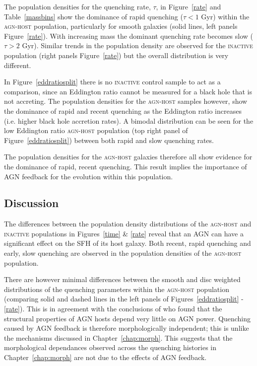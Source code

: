 The population densities for the quenching rate, $\tau$, in Figure~\ref{rate} and Table~\ref{massbins} show the dominance of rapid quenching ($\tau < 1$ Gyr) within the \textsc{agn-host} population, particularly for smooth galaxies (solid lines, left panels Figure~\ref{rate}). With increasing mass the dominant quenching rate becomes slow ($\tau > 2$ Gyr). Similar trends in the population density are observed for the \textsc{inactive} population (right panels Figure~\ref{rate}) but the overall distribution is very different. 

In Figure~\ref{eddratiosplit} there is no \textsc{inactive} control sample to act as a comparison, since an Eddington ratio cannot be measured for a black hole that is not accreting. The population densities for the \textsc{agn-host} samples however, show the dominance of rapid and recent quenching as the Eddington ratio increases (i.e. higher black hole accretion rates). A bimodal distribution can be seen for the low Eddington ratio \textsc{agn-host} population (top right panel of Figure~\ref{eddratiosplit}) between both rapid and slow quenching rates. 

The population densities for the \textsc{agn-host} galaxies therefore all show evidence for the dominance of rapid, recent quenching. This result implies the importance of AGN feedback for the evolution within this population.

\subsection{Discussion}\label{sec:agndis}

The differences between the population density distributions of the \textsc{agn-host} and \textsc{inactive} populations in Figures~\ref{time} \& \ref{rate} reveal that an AGN can have a significant effect on the SFH of its host galaxy. Both recent, rapid quenching and early, slow quenching are observed in the population densities of the \textsc{agn-host} population. 

There are however minimal differences between the smooth and disc weighted distributions of the quenching parameters within the \textsc{agn-host} population (comparing solid and dashed lines in the left panels of Figures~\ref{eddratiosplit} - \ref{rate}). This is in agreement with the conclusions of \citet{kauffmann03b} who found that the structural properties of AGN hosts depend very little on AGN power. Quenching caused by AGN feedback is therefore morphologically independent; this is unlike the mechanisms discussed in Chapter~\ref{chap:morph}. This suggests that the morphological dependances observed across the quenching histories in Chapter~\ref{chap:morph} are not due to the effects of AGN feedback. 

